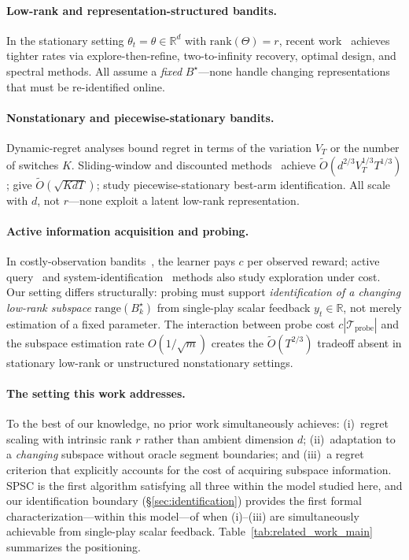 \documentclass{article}
\newcommand{\R}{\mathbb{R}}
\newcommand{\cTprobe}{\mathcal{T}_{\mathrm{probe}}}
\newcommand{\rank}{\mathrm{rank}}
\newcommand{\range}{\mathrm{range}}
\begin{document}
\paragraph{Low-rank and representation-structured bandits.}
In the stationary setting $\theta_t = \theta \in \R^d$ with $\rank(\Theta) = r$,
recent work~\citep{kang2022gestt, pmlr-v235-jedra24a, pmlr-v235-jang24e, stojanovic2023spectral} achieves tighter rates via explore-then-refine, two-to-infinity recovery, optimal design, and spectral methods. All assume a \emph{fixed} $B^\star$---none handle changing representations that must be re-identified online.

\paragraph{Nonstationary and piecewise-stationary bandits.}
Dynamic-regret analyses bound regret in terms of the variation $V_T$ or the number of switches $K$.
Sliding-window and discounted methods~\citep{russac2019weighted, cheung2019learning} achieve $\widetilde O(d^{2/3}V_T^{1/3}T^{1/3})$; \citet{abbasi2023dynamic} give $\widetilde O(\sqrt{KdT})$; \citet{hou2024pslb} study piecewise-stationary best-arm identification. All scale with $d$, not $r$---none exploit a latent low-rank representation.

\paragraph{Active information acquisition and probing.}
In costly-observation bandits~\citep{seldin2014paid, tucker2023costly, elumar2025costly}, the learner pays $c$ per observed reward; active query~\citep{sekhari2023contextual} and system-identification~\citep{memmel2024asid} methods also study exploration under cost.
Our setting differs structurally: probing must support \emph{identification of a changing low-rank subspace} $\range(B_k^\star)$ from single-play scalar feedback $y_t \in \R$, not merely estimation of a fixed parameter.
The interaction between probe cost $c|\cTprobe|$ and the subspace estimation rate $O(1/\sqrt{m})$ creates the $\widetilde O(T^{2/3})$ tradeoff absent in stationary low-rank or unstructured nonstationary settings.

\paragraph{The setting this work addresses.}
To the best of our knowledge, no prior work simultaneously achieves:
(i)~regret scaling with intrinsic rank $r$ rather than ambient dimension $d$;
(ii)~adaptation to a \emph{changing} subspace without oracle segment boundaries;
and (iii)~a regret criterion that explicitly accounts for the cost of acquiring subspace information.
SPSC is the first algorithm satisfying all three within the model studied here, and our identification boundary (\S\ref{sec:identification}) provides the first formal characterization---within this model---of when (i)--(iii) are simultaneously achievable from single-play scalar feedback.
Table~\ref{tab:related_work_main} summarizes the positioning.
\end{document}
